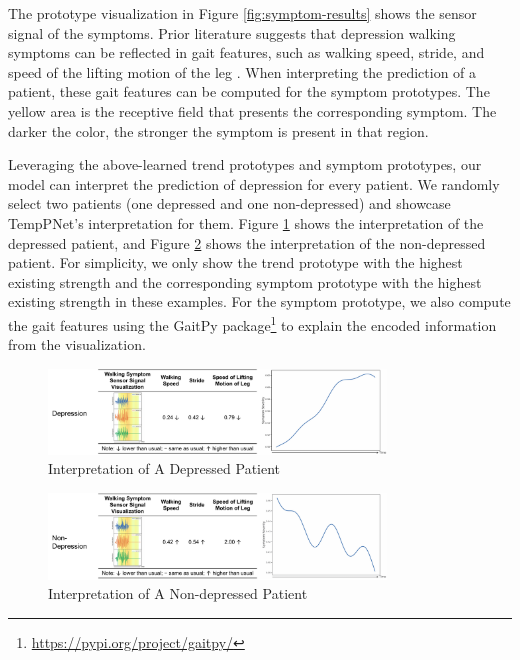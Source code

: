 \documentclass[mnsc]{informs3b} %
\begin{document}
The prototype visualization in Figure \ref{fig:symptom-results} shows the sensor signal of the symptoms. Prior literature suggests that depression walking symptoms can be reflected in gait features, such as walking speed, stride, and speed of the lifting motion of the leg \citep{sloman_gait_1982,lemke_spatiotemporal_2000,nhs_symptoms_2022}. When interpreting the prediction of a patient, these gait features can be computed for the symptom prototypes. The yellow area is the receptive field that presents the corresponding symptom. The darker the color, the stronger the symptom is present in that region.

Leveraging the above-learned trend prototypes and symptom prototypes, our model can interpret the prediction of depression for every patient. We randomly select two patients (one depressed and one non-depressed) and showcase TempPNet's interpretation for them. Figure \ref{fig:interpret-depression} shows the interpretation of the depressed patient, and Figure \ref{fig:interpret-nondepression} shows the interpretation of the non-depressed patient. For simplicity, we only show the trend prototype with the highest existing strength and the corresponding symptom prototype with the highest existing strength in these examples. For the symptom prototype, we also compute the gait features using the GaitPy package\footnote{\url{https://pypi.org/project/gaitpy/}} to explain the encoded information from the visualization.

\begin{figure}[h]
    \centering
    \includegraphics[width=0.8\textwidth]{imgs/interpret-depression.pdf}
    \caption{Interpretation of A Depressed Patient}
    \label{fig:interpret-depression}
\end{figure}

\begin{figure}[h]
    \centering
    \includegraphics[width=0.8\textwidth]{imgs/interpret-nondepression.pdf}
    \caption{Interpretation of A Non-depressed Patient}
    \label{fig:interpret-nondepression}
\end{figure}
\end{document}
